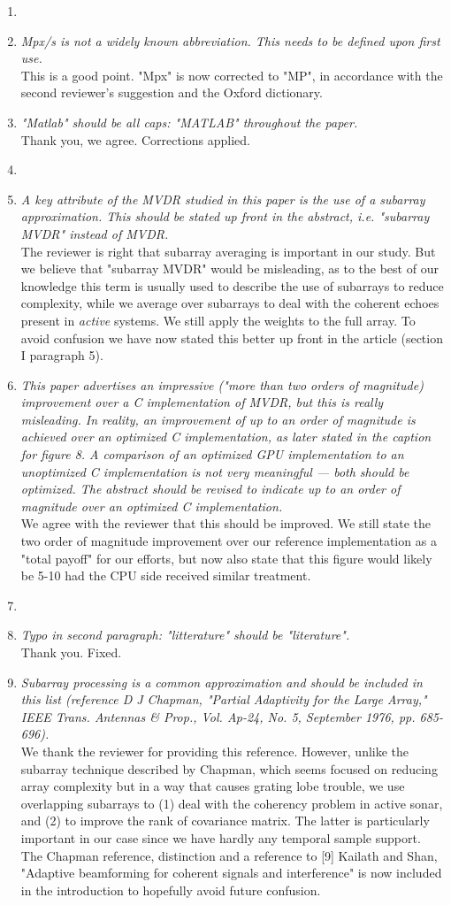 \documentclass[11pt]{article} %
\newcommand\1{\vec 1}
\newcommand\q[1]{\textit{#1}}
\newcommand\qi[1]{\item\q{#1}}
\newcommand\hi[1]{\item[\textbf{#1}]}
\newcommand\ans[1]{#1}
\newcommand\ai[1]{\\[.5\baselineskip]\ans{#1}}
\begin{document}
\begin{enumerate}
\hi{General}
\qi{Mpx/s is not a widely known abbreviation. This needs to be defined upon first use.}
\ai{This is a good point. "Mpx" is now corrected to "MP", in accordance with the second reviewer's suggestion and the Oxford dictionary.}
\qi{"Matlab" should be all caps: "MATLAB" throughout the paper.}
\ai{Thank you, we agree. Corrections applied.}
%
\hi{Abstract}
\qi{A key attribute of the MVDR studied in this paper is the use of a subarray approximation. This should be stated up front in the abstract, i.e. "subarray MVDR" instead of MVDR.}
\ai{The reviewer is right that subarray averaging is important in our study. But we believe that "subarray MVDR" would be misleading, as to the best of our knowledge this term is usually used to describe the use of subarrays to reduce complexity, while we average over subarrays to deal with the coherent echoes present in \emph{active} systems. We still apply the weights to the full array. To avoid confusion we have now stated this better up front in the article (section I paragraph 5).}
%
\qi{This paper advertises an impressive ("more than two orders of magnitude) improvement over a C implementation of MVDR, but this is really misleading. In reality, an improvement of up to an order of magnitude is achieved over an optimized C implementation, as later stated in the caption for figure 8. A comparison of an optimized GPU implementation to an unoptimized C implementation is not very meaningful — both should be optimized. The abstract should be revised to indicate up to an order of magnitude over an optimized C implementation.}
\ai{We agree with the reviewer that this should be improved. We still state the two order of magnitude improvement over our reference implementation as a "total payoff" for our efforts, but now also state that this figure would likely be 5-10 had the CPU side received similar treatment.}
%
\hi{Section I}
\qi{Typo in second paragraph: "litterature" should be "literature".}
\ai{Thank you. Fixed.}
%
\qi{Subarray processing is a common approximation and should be included in this list (reference D J Chapman, "Partial Adaptivity for the Large Array," IEEE Trans. Antennas \& Prop., Vol. Ap-24, No. 5, September 1976, pp. 685-696).}
\ai{We thank the reviewer for providing this reference. However, unlike the subarray technique described by Chapman, which seems focused on reducing array complexity but in a way that causes grating lobe trouble, we use overlapping subarrays to (1) deal with the coherency problem in active sonar, and (2) to improve the rank of covariance matrix. The latter is particularly important in our case since we have hardly any temporal sample support. The Chapman reference,  distinction and a reference to [9] Kailath and Shan, "Adaptive beamforming for coherent signals and interference" is now included in the introduction to hopefully avoid future confusion.}

\end{enumerate}
\end{document}
